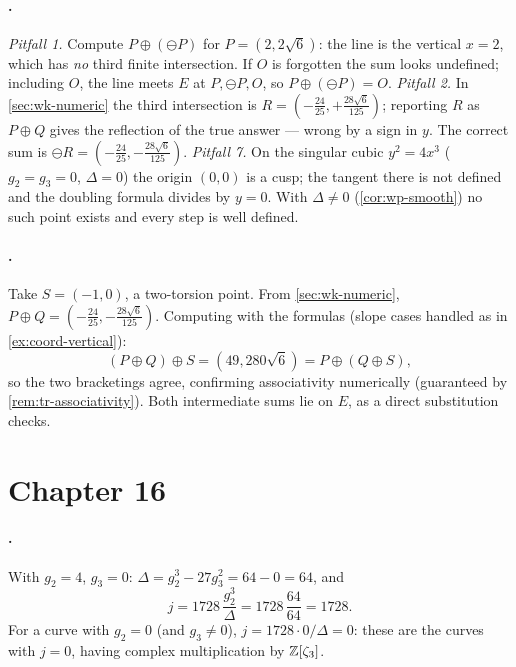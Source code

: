 \paragraph{.}
\emph{Pitfall 1.} Compute \(P \oplus (\ominus P)\) for \(P = (2, 2\sqrt6)\): the
line is the vertical \(x = 2\), which has \emph{no} third finite intersection. If
\(O\) is forgotten the sum looks undefined; including \(O\), the line meets \(E\)
at \(P, \ominus P, O\), so \(P \oplus (\ominus P) = O\).
\emph{Pitfall 2.} In \cref{sec:wk-numeric} the third intersection is
\(R = (-\tfrac{24}{25}, +\tfrac{28\sqrt6}{125})\); reporting \(R\) as \(P \oplus Q\)
gives the reflection of the true answer --- wrong by a sign in \(y\). The correct
sum is \(\ominus R = (-\tfrac{24}{25}, -\tfrac{28\sqrt6}{125})\).
\emph{Pitfall 7.} On the singular cubic \(y^2 = 4x^3\) (\(g_2 = g_3 = 0\),
\(\Delta = 0\)) the origin \((0,0)\) is a cusp; the tangent there is not defined and
the doubling formula divides by \(y = 0\). With \(\Delta \ne 0\)
(\cref{cor:wp-smooth}) no such point exists and every step is well defined.

\paragraph{.}
Take \(S = (-1, 0)\), a two-torsion point. From \cref{sec:wk-numeric},
\(P \oplus Q = (-\tfrac{24}{25}, -\tfrac{28\sqrt6}{125})\). Computing with the
formulas (slope cases handled as in \cref{ex:coord-vertical}):
\[
  (P \oplus Q) \oplus S = (49, 280\sqrt6) = P \oplus (Q \oplus S),
\]
so the two bracketings agree, confirming associativity numerically (guaranteed by
\cref{rem:tr-associativity}). Both intermediate sums lie on \(E\), as a direct
substitution checks.

\section{Chapter 16}
\label{sec:soln-ch16}

\paragraph{.}
With \(g_2 = 4\), \(g_3 = 0\): \(\Delta = g_2^3 - 27 g_3^2 = 64 - 0 = 64\), and
\[
  j = 1728\,\frac{g_2^3}{\Delta} = 1728\,\frac{64}{64} = 1728 .
\]
For a curve with \(g_2 = 0\) (and \(g_3 \ne 0\)), \(j = 1728 \cdot 0/\Delta = 0\):
these are the curves with \(j = 0\), having complex multiplication by
\(\mathbb{Z}[\zeta_3]\).

